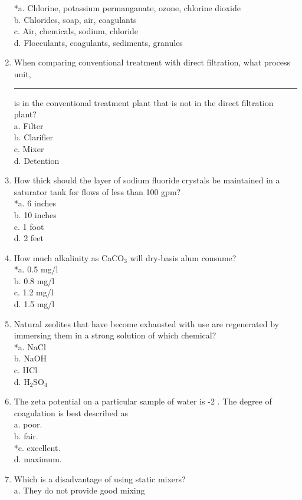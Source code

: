 \begin{enumerate}
*a. Chlorine, potassium permanganate, ozone, chlorine dioxide\\
b. Chlorides, soap, air, coagulants\\
c. Air, chemicals, sodium, chloride\\
d. Flocculants, coagulants, sediments, granules\\
\item When comparing conventional treatment with direct filtration, what process unit, \rule{1.5cm}{0.5pt} is in the conventional treatment plant that is not in the direct filtration plant?\\
a. Filter\\
b. Clarifier\\
c. Mixer\\
d. Detention\\
\item How thick should the layer of sodium fluoride crystals be maintained in a saturator tank for flows of less than 100 gpm?\\
*a. 6 inches\\
b. 10 inches\\
c. 1 foot\\
d. 2 feet\\
\item How much alkalinity as CaCO$_{3}$ will dry-basis alum consume?\\
*a. 0.5 mg/l\\
b. 0.8 mg/l\\
c. 1.2 mg/l\\
d. 1.5 mg/l\\
\item Natural zeolites that have become exhausted with use are regenerated by immersing them in a strong solution of which chemical?\\
*a. NaCl\\
b. NaOH\\
c. HCl\\
d. H$_2$SO$_4$ \\
\item The zeta potential on a particular sample of water is -2 . The degree of coagulation is best described as\\
a. poor.\\
b. fair.\\
*c. excellent.\\
d. maximum.\\
\item Which is a disadvantage of using static mixers?\\
a. They do not provide good mixing\\

\end{enumerate}
